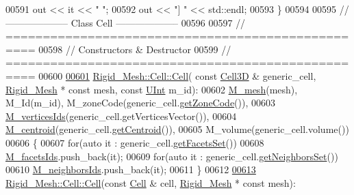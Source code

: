 \begin{DoxyCode}
00591             out << it << \textcolor{stringliteral}{" "};
00592     out << \textcolor{stringliteral}{"] "} << std::endl;
00593 \}
00594 
00595 \textcolor{comment}{// --------------------   Class Cell   --------------------}
00596 
00597 \textcolor{comment}{// ==================================================}
00598 \textcolor{comment}{// Constructors & Destructor}
00599 \textcolor{comment}{// ==================================================}
00600 
\hypertarget{RigidMesh_8cpp_source.tex_l00601}{}\hyperlink{classFVCode3D_1_1Rigid__Mesh_1_1Cell_ad8a3fb94b11638f328a9f647c5a73c4c}{00601} \hyperlink{classFVCode3D_1_1Rigid__Mesh_1_1Cell_aaa5efd433c30628772159010d1858d16}{Rigid\_Mesh::Cell::Cell}( \textcolor{keyword}{const} \hyperlink{classFVCode3D_1_1Mesh3D_1_1Cell3D}{Cell3D} & generic\_cell, 
      \hyperlink{classFVCode3D_1_1Rigid__Mesh}{Rigid\_Mesh} * \textcolor{keyword}{const} mesh, \textcolor{keyword}{const} \hyperlink{namespaceFVCode3D_a4bf7e328c75d0fd504050d040ebe9eda}{UInt} m\_id):
00602     \hyperlink{classFVCode3D_1_1Rigid__Mesh_1_1Facet_af220d353a3aad7de9b1fa293ac594893}{M\_mesh}(mesh), M\_Id(m\_id), M\_zoneCode(generic\_cell.\hyperlink{classFVCode3D_1_1Rigid__Mesh_1_1Facet_a051d02ca6fb8096021de8519cd6a90ed}{getZoneCode}()),
00603     \hyperlink{classFVCode3D_1_1Rigid__Mesh_1_1Facet_a4db7298b2b4607ec53de41887df9a025}{M\_verticesIds}(generic\_cell.getVerticesVector()),
00604     \hyperlink{classFVCode3D_1_1Rigid__Mesh_1_1Facet_a59362b500ff0b33abe8b2bc2ea678916}{M\_centroid}(generic\_cell.\hyperlink{classFVCode3D_1_1Rigid__Mesh_1_1Facet_a0d4bcc392ef3da56ccdb40c22b6319e3}{getCentroid}()),
00605     M\_volume(generic\_cell.volume())
00606 \{
00607     \textcolor{keywordflow}{for}(\textcolor{keyword}{auto} it : generic\_cell.\hyperlink{classFVCode3D_1_1Mesh3D_1_1Cell3D_ab39f9e4bf268566da035b41ce6a409be}{getFacetsSet}())
00608         \hyperlink{classFVCode3D_1_1Rigid__Mesh_1_1Cell_a9484ef98b77a1e7588b29baac5cf27db}{M\_facetsIds}.push\_back(it);
00609     \textcolor{keywordflow}{for}(\textcolor{keyword}{auto} it : generic\_cell.\hyperlink{classFVCode3D_1_1Mesh3D_1_1Cell3D_a87f2464749df5772205e0dd76afe46e6}{getNeighborsSet}())
00610         \hyperlink{classFVCode3D_1_1Rigid__Mesh_1_1Cell_a660774a8bb678b874639c9c1ea713bc6}{M\_neighborsIds}.push\_back(it);
00611 \}
00612 
\hypertarget{RigidMesh_8cpp_source.tex_l00613}{}\hyperlink{classFVCode3D_1_1Rigid__Mesh_1_1Cell_a0b2887ea5ac27020284c71606c92de05}{00613} \hyperlink{classFVCode3D_1_1Rigid__Mesh_1_1Cell_aaa5efd433c30628772159010d1858d16}{Rigid\_Mesh::Cell::Cell}(\textcolor{keyword}{const} \hyperlink{classFVCode3D_1_1Rigid__Mesh_1_1Cell}{Cell} & cell, \hyperlink{classFVCode3D_1_1Rigid__Mesh}{Rigid\_Mesh} * \textcolor{keyword}{const} mesh):

\end{DoxyCode}
